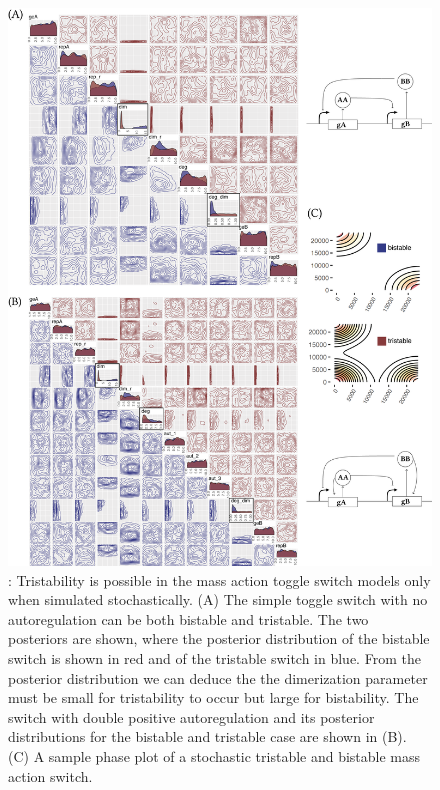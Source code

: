 \begin{figure}[htbp]
\centerfloat
\includegraphics[width=1.1\textwidth]{../../chapters/chapterStabilityFinder/images/MA_stoch_design_princ.png}
\caption[Multistability in the stochastic mass action models]{ \label{fig:fig7}: Tristability is possible in the mass action toggle switch models only when simulated stochastically. (A) The simple toggle switch with no autoregulation can be both bistable and tristable. The two posteriors are shown, where the posterior distribution of the bistable switch is shown in red and of the tristable switch in blue. From the posterior distribution we can deduce the the dimerization parameter must be small for tristability to occur but large for bistability. The switch with double positive autoregulation and its posterior distributions for the bistable and tristable case are shown in (B). (C) A sample phase plot of a stochastic tristable and bistable mass action switch. }
\end{figure}
\clearpage


